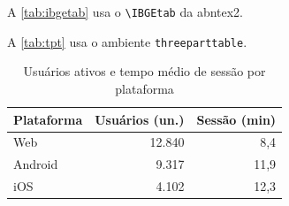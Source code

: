 \documentclass[12pt, a4paper, brazilian]{abntex2}
\begin{document}
A \autoref{tab:ibgetab} usa o \texttt{\textbackslash IBGEtab} da abntex2.

\begin{table}[htbp]
\end{table}

\clearpage

A \autoref{tab:tpt} usa o ambiente \texttt{threeparttable}.

\begin{table}[htbp]
  \centering
  \begin{threeparttable}
    \caption{Usuários ativos e tempo médio de sessão por plataforma}%
    \label{tab:tpt}
    \begin{tabular}{lrr}
      \toprule
      \textbf{Plataforma} & \textbf{Usuários (un.)} & \textbf{Sessão (min)} \\
      \midrule
      Web     & 12.840 &  8,4 \\
      Android &  9.317 & 11,9 \\
      iOS     &  4.102 & 12,3 \\
      \bottomrule
    \end{tabular}
  \end{threeparttable}
\end{table}
\end{document}
